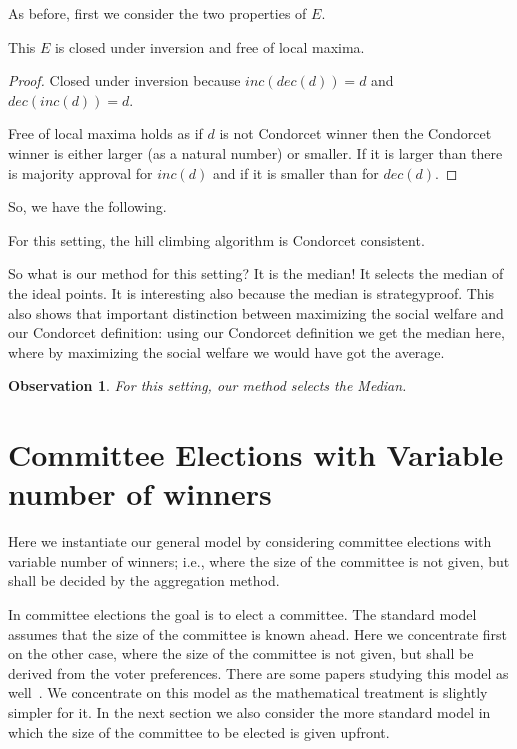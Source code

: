 \documentclass[sigconf]{aamas}  %
\newtheorem{observation}{Observation}
\begin{document}
As before, first we consider the two properties of $E$.

\begin{lemma}
  This $E$ is closed under inversion and free of local maxima.
\end{lemma}

\begin{proof}
%
Closed under inversion because $inc(dec(d)) = d$ and $dec(inc(d)) = d$.

Free of local maxima holds as if $d$ is not Condorcet winner then the Condorcet winner is either larger (as a natural number) or smaller. If it is larger than there is majority approval for $inc(d)$ and if it is smaller than for $dec(d)$.
%
\end{proof}

So, we have the following.

\begin{corollary}
  For this setting, the hill climbing algorithm is Condorcet consistent.
\end{corollary}

So what is our method for this setting? It is the median! It selects the median of the ideal points.
It is interesting also because the median is strategyproof.
This also shows that important distinction between maximizing the social welfare and our Condorcet definition:
  using our Condorcet definition we get the median here, where by maximizing the social welfare we would have got the average.

\begin{observation}
  For this setting, our method selects the Median.
\end{observation}


\section{Committee Elections with Variable number of winners}
\label{section:commiteee election}

Here we instantiate our general model by considering committee elections with variable number of winners; i.e., where the size of the committee is not given, but shall be decided by the aggregation method.

In committee elections the goal is to elect a committee. The standard model assumes that the size of the committee is known ahead.
Here we concentrate first on the other case, where the size of the committee is not given, but shall be derived from the voter preferences. There are some papers studying this model as well~\cite{kilgourvnw,vnw}.
We concentrate on this model as the mathematical treatment is slightly simpler for it. In the next section we also consider the more standard model in which the size of the committee to be elected is given upfront.
\end{document}
